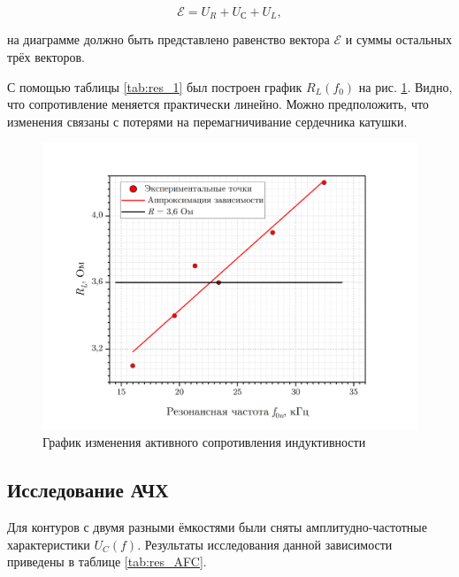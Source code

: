 \documentclass[a4paper, 12pt]{article}
\begin{document}
    \begin{equation}
        \label{kir}
	\mathcal{E} = U_R + U_С + U_L,
    \end{equation} 
    
    на диаграмме должно быть представлено равенство вектора $\mathcal{E}$ и суммы остальных трёх векторов.

    С помощью таблицы \ref{tab:res_1} был построен график $R_L(f_0) $ на рис. \ref{graph_RL}. Видно, что сопротивление меняется практически линейно. Можно предположить, что изменения связаны с потерями на перемагничивание сердечника катушки. 

    \begin{figure}[H]
        \centering
        \includegraphics[width = 14 cm]{images/graph_RL.png}
        \caption{График изменения активного сопротивления индуктивности}
        \label{graph_RL}
    \end{figure}
    
    \subsection{Исследование АЧХ}

    Для контуров с двумя разными ёмкостями были сняты амплитудно-частотные характеристики $U_C(f)$. Результаты исследования данной зависимости приведены в таблице \ref{tab:res_AFC}.
\end{document}

